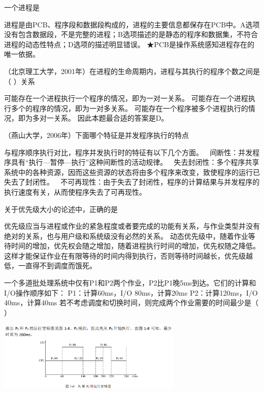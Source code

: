 \question 一个进程是
\par{}
\begin{solution}进程是由PCB、程序段和数据段构成的，进程的主要信息都保存在PCB中。A选项没有包含数据段，不是完整的进程；B选项描述的是静态的程序和数据集，不符合进程的动态性特点；D选项的描述明显错误。
★PCB是操作系统感知进程存在的唯一依据。
\end{solution}
\question （北京理工大学，2001年）在进程的生命周期内，进程与其执行的程序个数之间是（
）关系
\par{}
\begin{solution}可能存在一个进程执行一个程序的情况，即为一对一关系。
可能存在一个进程执行多个的程序的情况，即为一对多关系。
可能存在一个程序被多个进程执行的情况，即为多对一关系。
因此本题最合适的答案是D。
\end{solution}
\question （燕山大学，2006年）下面哪个特征是并发程序执行的特点
\par{}
\begin{solution}与程序顺序执行对比，程序并发执行时的特征有以下几个方面。 
间断性：并发程序具有``执行---暂停---执行''这种间断性的活动规律。 
失去封闭性：多个程序共享系统中的各种资源，因而这些资源的状态将由多个程序来改变，致使程序的运行已失去了封闭性。

不可再现性：由于失去了封闭性，程序的计算结果与并发程序的执行速度有关，从而使程序失去了可再现性。
\end{solution}
\question 关于优先级大小的论述中，正确的是
\par{}
\begin{solution}优先级应当与进程或作业的紧急程度或者要完成的功能有关系，与作业类型并没有绝对的关系，也与用户级和系统级没有必然的关系。
动态优先级中，随着作业等待时间的增加，优先权会随之增加，随着进程执行时间的增加，优先权随之降低。这样才能保证作业在有限等待的时间内得到执行，否则等待时间越长，优先级越低，一直得不到调度而饿死。
\end{solution}
\question 一个多道批处理系统中仅有P1和P2两个作业，P2比P1晚5ms到达。它们的计算和I/O操作顺序如下：
P1：计算60ms，I/O 80ms，计算20ms P2：计算120ms，I/O 40ms，计算40ms
若不考虑调度和切换时间，则完成两个作业需要的时间最少是（ ）
\par{}
\begin{solution}\includegraphics[width=3.46875in,height=1.32292in]{computerassets/9B057B841FA35D592A38935D909C62F2.png}
\end{solution}
